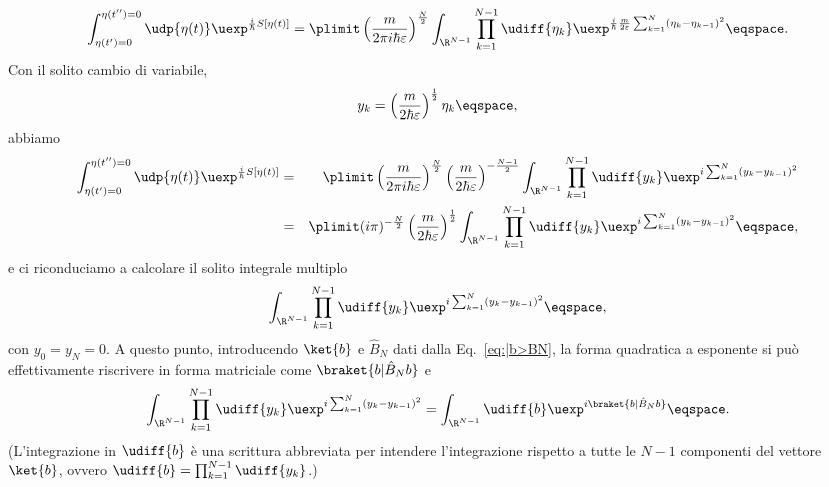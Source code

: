 \begin{displaymath}
\int_{\eta(t')=0}^{\eta(t'') = 0 } \udp{\eta(t)}
\uexp^{\frac{i}{\hbar} S[\eta(t)] } 
= \plimit   \left( \frac{m}{2\pi i \hbar \varepsilon} \right)^{\frac{N}{2}}
\int_{\R^{N-1}} \prod_{k=1}^{N-1} \udiff{\eta_{k}} 
\uexp^{ \frac{i}{\hbar} \frac{m}{2\varepsilon}
\sum_{k=1}^{N} \left( \eta_{k} - \eta_{k-1} \right)^{2} }  \eqspace .
\end{displaymath}
Con il solito cambio di variabile, 
\begin{displaymath}
y_{k} = \left( \frac{m}{2\hbar \varepsilon} \right)^{\frac{1}{2}}  \eta_{k}
\eqspace ,
\end{displaymath}
abbiamo
\begin{eqnarray*}
\int_{\eta(t')=0}^{\eta(t'') = 0 } \udp{\eta(t)}
\uexp^{\frac{i}{\hbar} S[\eta(t)] } 
&=&
\plimit  \left( \frac{m}{2\pi i \hbar \varepsilon} \right)^{\frac{N}{2}} \left(
\frac{m}{2\hbar\varepsilon } \right)^{- \frac{N-1}{2}}  
  \int_{\R^{N-1}} \prod_{k=1}^{N-1}
\udiff{y_{k}} \uexp^{ i \sum_{k=1}^{N} \left( y_{k} - y_{k-1} \right)^{2}}
\\
&=& \plimit (i \pi)^{-\frac{N}{2}}  \left( \frac{m}{2\hbar \varepsilon}
\right)^{\frac{1}{2}} 
\int_{\R^{N-1}} \prod_{k=1}^{N-1} \udiff{y_{k}} \uexp^{ i \sum_{k=1}^{N} \left(
y_{k} - y_{k-1}\right)^{2}} \eqspace, 
\end{eqnarray*}
e ci riconduciamo a calcolare il
 solito integrale multiplo 
\begin{displaymath}
\int_{\R^{N-1}} \prod_{k=1}^{N-1} \udiff{y_{k}} \uexp^{ i \sum_{k=1}^{N} \left(
y_{k} - y_{k-1} \right)^{2}} \eqspace,  
\end{displaymath}
con $y_{0} = y_{N} = 0$.  
A questo punto, introducendo  $\ket{b}$ e $\hat{B}_{N}$
dati dalla Eq.~\eqref{eq:|b>BN},
la forma quadratica a esponente si pu\`o effettivamente riscrivere in forma
matriciale come 
$\braket{b | \hat{B}_{N} b} $ e
\begin{displaymath}
\int_{\R^{N-1}} \prod_{k=1}^{N-1} \udiff{y_{k}} \uexp^{ i \sum_{k=1}^{N} \left(
y_{k} - y_{k-1} \right)^{2}} =
 \int_{\R^{N-1} } \udiff{b} 
\uexp^{ i \braket{b | \hat{B}_{N} b}}  \eqspace .
\end{displaymath}
(L'integrazione in $\udiff{b}$ \`e una scrittura abbreviata per intendere
l'integrazione rispetto a tutte le $N-1$ componenti del vettore $\ket{b}$,
ovvero $\udiff{b} = \prod_{k=1}^{N-1} \udiff{y_{k}}$.)

